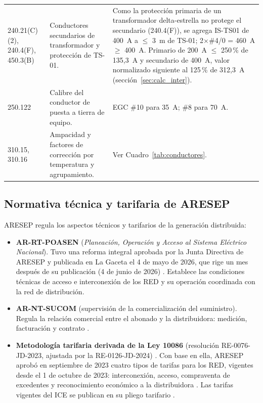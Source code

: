 \documentclass[12pt]{article}
\begin{document}
{\begin{longtable}{L{2.25cm}L{5.85cm}L{6.9cm}}
240.21(C)(2), 240.4(F), 450.3(B) & Conductores secundarios de transformador y protección de TS-01. & Como la protección primaria de un transformador delta-estrella no protege el secundario (240.4(F)), se agrega IS-TS01 de 400~A a $\leq$ 3~m de TS-01; 2$\times$\#4/0 = 460~A $\geq$ 400~A. Primario de 200~A $\leq$ 250\,\% de 135,3~A y secundario de 400~A, valor normalizado siguiente al 125\,\% de 312,3~A (sección~\ref{sec:calc_inter}).\\
250.122 & Calibre del conductor de puesta a tierra de equipo. & EGC \#10 para \SI{35}{\ampere}; \#8 para \SI{70}{\ampere}.\\
310.15, 310.16 & Ampacidad y factores de corrección por temperatura y agrupamiento. & Ver Cuadro~\ref{tab:conductores}.\\
\bottomrule
\end{longtable}}

\subsection{Normativa técnica y tarifaria de ARESEP}
ARESEP regula los aspectos técnicos y tarifarios de la generación distribuida:
\begin{itemize}
\item \textbf{AR-RT-POASEN} (\emph{Planeación, Operación y Acceso al Sistema Eléctrico Nacional}). Tuvo una reforma integral aprobada por la Junta Directiva de ARESEP y publicada en La Gaceta el 4 de mayo de 2026, que rige un mes después de su publicación (4 de junio de 2026) \cite{aresepNorm,poasen2026}. Establece las condiciones técnicas de acceso e interconexión de los RED y su operación coordinada con la red de distribución.
\item \textbf{AR-NT-SUCOM} (supervisión de la comercialización del suministro). Regula la relación comercial entre el abonado y la distribuidora: medición, facturación y contrato \cite{aresepNorm}.
\item \textbf{Metodología tarifaria derivada de la Ley 10086} (resolución RE-0076-JD-2023, ajustada por la RE-0126-JD-2024) \cite{aresepMetod}. Con base en ella, ARESEP aprobó en septiembre de 2023 cuatro tipos de tarifas para los RED, vigentes desde el 1 de octubre de 2023: interconexión, acceso, compraventa de excedentes y reconocimiento económico a la distribuidora \cite{aresepGD}. Las tarifas vigentes del ICE se publican en su pliego tarifario \cite{iceGD}.
\end{itemize}
\end{document}
